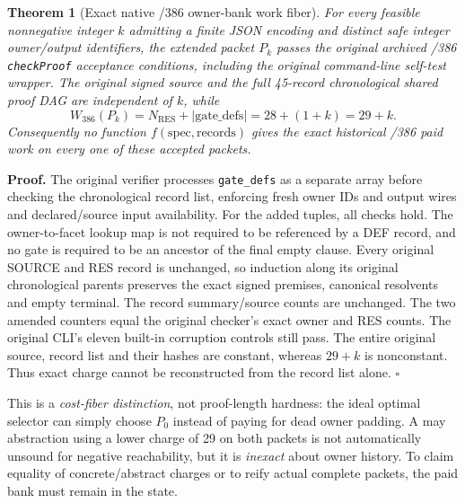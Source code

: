 \documentclass[11pt]{article}
\newtheorem{theorem}{Theorem}
\begin{document}
\begin{theorem}[Exact native /386 owner-bank work fiber]
For every feasible nonnegative integer \(k\) admitting a finite JSON encoding and distinct safe integer owner/output identifiers, the extended packet \(P_k\) passes the original archived /386 \texttt{checkProof} acceptance conditions, including the original command-line self-test wrapper. The original signed source and the full 45-record chronological shared proof DAG are independent of \(k\), while
\[
 W_{386}(P_k)=N_{\mathrm{RES}}+|\mathrm{gate\_defs}|=28+(1+k)=29+k.
\]
Consequently no function \(f(\mathrm{spec},\mathrm{records})\) gives the \emph{exact} historical /386 paid work on every one of these accepted packets.
\end{theorem}
\noindent \textbf{Proof.} The original verifier processes \texttt{gate\_defs} as a separate array before checking the chronological record list, enforcing fresh owner IDs and output wires and declared/source input availability. For the added tuples, all checks hold. The owner-to-facet lookup map is not required to be referenced by a DEF record, and no gate is required to be an ancestor of the final empty clause. Every original SOURCE and RES record is unchanged, so induction along its original chronological parents preserves the exact signed premises, canonical resolvents and empty terminal. The record summary/source counts are unchanged. The two amended counters equal the original checker's exact owner and RES counts. The original CLI's eleven built-in corruption controls still pass. The entire original source, record list and their hashes are constant, whereas \(29+k\) is nonconstant. Thus exact charge cannot be reconstructed from the record list alone. \(\square\)

This is a \emph{cost-fiber distinction}, not proof-length hardness: the ideal optimal selector can simply choose \(P_0\) instead of paying for dead owner padding. A may abstraction using a lower charge of 29 on both packets is not automatically unsound for negative reachability, but it is \emph{inexact} about owner history. To claim equality of concrete/abstract charges or to reify actual complete packets, the paid bank must remain in the state.
\end{document}
